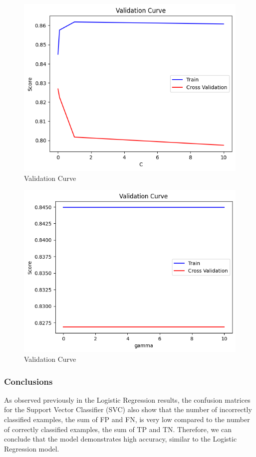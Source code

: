 \begin{figure}[H]
    \centering
    \includegraphics[width=0.75\linewidth]{images/validation_curve_c_svc.png}
    \caption{Validation Curve}
    \label{fig:ValidationCurveC_SVC}
\end{figure}
\begin{figure}[H]
    \centering
    \includegraphics[width=0.75\linewidth]{images/validation_curve_gamma_svc.png}
    \caption{Validation Curve}
    \label{fig:ValidationCurveGamma_SVC}
\end{figure}

\subsubsection{Conclusions}
As observed previously in the Logistic Regression results, the confusion matrices for the Support Vector Classifier (SVC) also show that the number of incorrectly classified examples, the sum of \acrfull{FP} and \acrfull{FN}, is very low compared to the number of correctly classified examples, the sum of \acrfull{TP} and \acrfull{TN}. Therefore, we can conclude that the model demonstrates high accuracy, similar to the Logistic Regression model.

